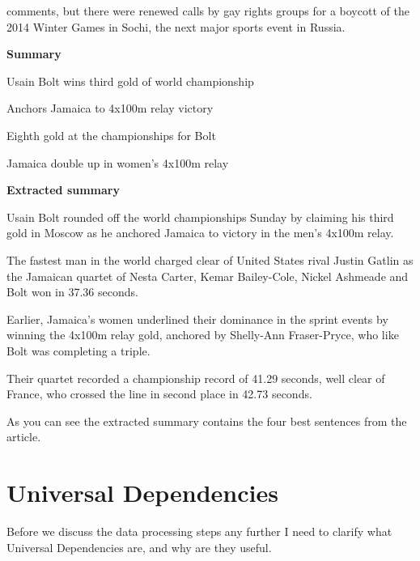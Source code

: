 {comments, but there were renewed calls by gay rights groups for a boycott of the 2014 Winter Games in Sochi, the next major sports event in Russia.

\textbf{Summary}

Usain Bolt wins third gold of world championship

Anchors Jamaica to 4x100m relay victory

Eighth gold at the championships for Bolt

Jamaica double up in women's 4x100m relay

\textbf{Extracted summary}

Usain Bolt rounded off the world championships Sunday by claiming his third gold in Moscow as he anchored Jamaica to victory in the men's 4x100m relay.

The fastest man in the world charged clear of United States rival Justin Gatlin as the Jamaican quartet of Nesta Carter, Kemar Bailey-Cole, Nickel Ashmeade and Bolt won in 37.36 seconds.

Earlier, Jamaica's women underlined their dominance in the sprint events by winning the 4x100m relay gold, anchored by Shelly-Ann Fraser-Pryce, who like Bolt was completing a triple.

Their quartet recorded a championship record of 41.29 seconds, well clear of France, who crossed the line in second place in 42.73 seconds.
}

As you can see the extracted summary contains the four best sentences from the article.
\section{Universal Dependencies}
Before we discuss the data processing steps any further I need to clarify what Universal Dependencies are, and why are they useful.

